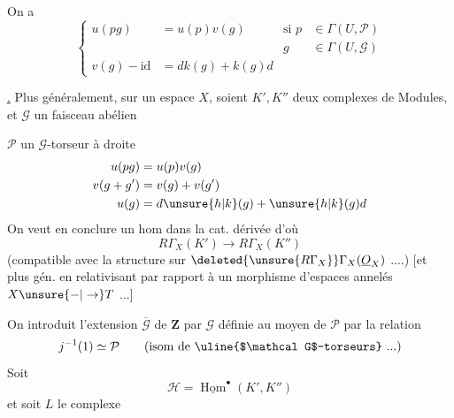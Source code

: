 On a
\[
\left\{\begin{aligned}
u(pg)&=u(p)v(g)\qquad&\text{si }p&\in\Gamma(U,\mathcal P)\\
&&g&\in\Gamma(U,\mathcal G)\\
v(g)-\mathrm{id}&=dk(g)+k(g)d
\end{aligned}\right.
\]

\uline{.}
Plus généralement, sur un espace   $X$, soient $K',K''$ deux complexes de Modules, et
$\mathcal G$ un faisceau abélien

$\mathcal P$ un $\mathcal G$-torseur à droite
\[
\begin{aligned}
u(pg)&=u(p)v(g)\\
v(g+g')&=v(g)+v(g')\\
u(g)&=d\unsure{h|k}(g)+\unsure{h|k}(g)d
\end{aligned}
\]
On veut en conclure un hom dans la cat. dérivée  d'où
\[
R\Gamma_X(K')\longrightarrow R\Gamma_X(K'')
\]
(compatible avec la structure sur $\deleted{\unsure{R\Gamma_X}}\Gamma_X(\underline O_X)$ ....)
[et plus gén. en relativisant par rapport à un morphisme d'espaces annelés $X\unsure{\mathbin{-}|\to}T$ ...]

On introduit l'extension $\overline{\mathcal G}$ de $\mathbf Z$ par $\mathcal G$
définie au moyen de $\mathcal P$ par la relation
\[
j^{-1}(1)\simeq\mathcal P\qquad(\text{isom de }\uline{$\mathcal G$-torseurs}\text{ ...})
\]
Soit
\[
\mathcal H=\underline{\operatorname{Hom}}^\bullet(K',K'')
\]
et soit $L$ le complexe

